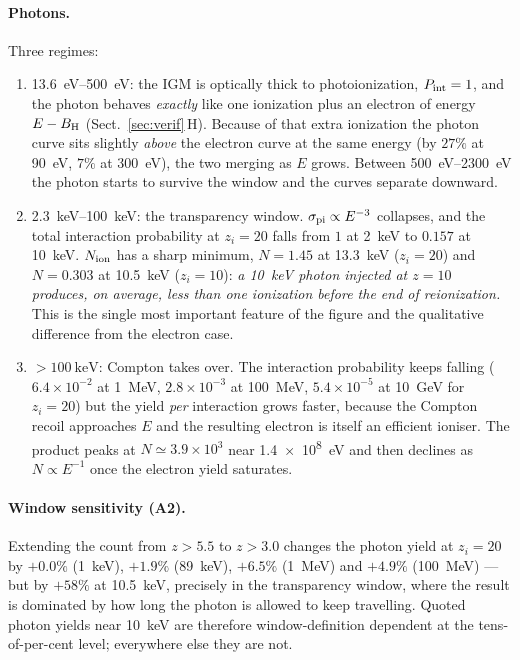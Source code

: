 \documentclass[11pt,a4paper]{article}
\begin{document}
\paragraph{Photons.}
Three regimes:
\begin{enumerate}\itemsep2pt
  \item \SIrange{13.6}{500}{\electronvolt}: the IGM is optically thick to
  photoionization, $P_{\rm int}=1$, and the photon behaves \emph{exactly} like
  one ionization plus an electron of energy $E-B_{\rm H}$
  (Sect.~\ref{sec:verif}\,H). Because of that extra ionization the photon
  curve sits slightly \emph{above} the electron curve at the same energy
  (by $27\%$ at \SI{90}{\electronvolt}, $7\%$ at \SI{300}{\electronvolt}),
  the two merging as $E$ grows. Between \SIrange{500}{2300}{\electronvolt} the
  photon starts to survive the window and the curves separate downward.
  \item \SIrange{2.3}{100}{\kilo\electronvolt}: the transparency window.
  $\sigma_{\rm pi}\propto E^{-3}$ collapses, and the total interaction
  probability at $z_i=20$ falls from $1$ at \SI{2}{\kilo\electronvolt} to
  $0.157$ at \SI{10}{\kilo\electronvolt}. $N_{\rm ion}$ has a sharp minimum,
  $N=1.45$ at \SI{13.3}{\kilo\electronvolt} ($z_i=20$) and $N=0.303$ at
  \SI{10.5}{\kilo\electronvolt} ($z_i=10$): \emph{a \SI{10}{\kilo\electronvolt}
  photon injected at $z=10$ produces, on average, less than one ionization
  before the end of reionization.} This is the single most important feature
  of the figure and the qualitative difference from the electron case.
  \item $>\SI{100}{\kilo\electronvolt}$: Compton takes over. The interaction
  probability keeps falling ($6.4\times10^{-2}$ at \SI{1}{\mega\electronvolt},
  $2.8\times10^{-3}$ at \SI{100}{\mega\electronvolt}, $5.4\times10^{-5}$ at
  \SI{10}{\giga\electronvolt} for $z_i=20$) but the yield \emph{per}
  interaction grows faster, because the Compton recoil approaches $E$ and the
  resulting electron is itself an efficient ioniser. The product peaks at
  $N\simeq3.9\times10^{3}$ near \SI{1.4e8}{\electronvolt} and then declines as
  $N\propto E^{-1}$ once the electron yield saturates.
\end{enumerate}

\paragraph{Window sensitivity (A2).}
Extending the count from $z>5.5$ to $z>3.0$ changes the photon yield at
$z_i=20$ by $+0.0\%$ (\SI{1}{\kilo\electronvolt}), $+1.9\%$
(\SI{89}{\kilo\electronvolt}), $+6.5\%$ (\SI{1}{\mega\electronvolt}) and
$+4.9\%$ (\SI{100}{\mega\electronvolt}) --- but by $+58\%$ at
\SI{10.5}{\kilo\electronvolt}, precisely in the transparency window, where the
result is dominated by how long the photon is allowed to keep travelling.
Quoted photon yields near \SI{10}{\kilo\electronvolt} are therefore
window-definition dependent at the tens-of-per-cent level; everywhere else
they are not.
\end{document}
